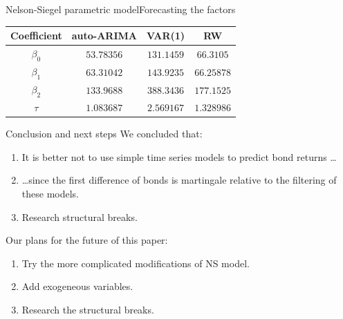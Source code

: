\documentclass[aspectratio=169]{beamer}
\begin{document}
    \begin{frame}{Nelson-Siegel parametric model}{Forecasting the factors}
    \begin{tabular}{|c | c c c|} 
        \hline
        Coefficient & auto-ARIMA & VAR(1) & RW \\
        \hline
        $\beta_0$ & $53.78356$ & $131.1459$ & $66.3105$ \\ 
        \hline
        $\beta_1$ & $63.31042$ & $143.9235$ & $66.25878$ \\
        \hline
        $\beta_2$ & $133.9688$ & $388.3436$ & $177.1525$ \\
        \hline
        $\tau$ & $1.083687$ & $2.569167$ & $1.328986$ \\
        \hline
    \end{tabular}
\end{frame}

    \begin{frame}{Conclusion and next steps}
    We concluded that:
    \begin{enumerate}
        \item It is better not to use simple time series 
        models to predict bond returns \ldots
        \item \ldots since the first difference of bonds is martingale relative to the filtering of these models.
        \item Research structural breaks.
    \end{enumerate}
    Our plans for the future of this paper:
    \begin{enumerate}
        \item Try the more complicated modifications of NS model.
        \item Add exogeneous variables.
        \item Research the structural breaks.
    \end{enumerate}
    \end{frame}
\end{document}
